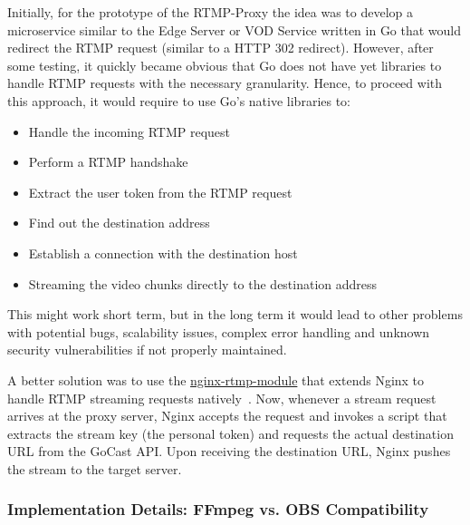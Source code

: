 Initially, for the prototype of the RTMP-Proxy the idea was to develop a microservice similar to the Edge Server or VOD Service written in Go that would redirect the \ac{RTMP} request (similar to a HTTP 302 redirect). However, after some testing, it quickly became obvious that Go does not have yet libraries to handle \ac{RTMP} requests with the necessary granularity. Hence, to proceed with this approach, it would require to use Go's native libraries to: 
\begin{itemize}
\item Handle the incoming \ac{RTMP} request
\item Perform a \ac{RTMP} handshake
\item Extract the user token from the \ac{RTMP} request
\item Find out the destination address
\item Establish a connection with the destination host
\item Streaming the video chunks directly to the destination address
\end{itemize}

\noindent This might work short term, but in the long term it would lead to other problems with potential bugs, scalability issues, complex error handling and unknown security vulnerabilities if not properly maintained.

A better solution was to use the \href{https://github.com/arut/nginx-rtmp-module}{nginx-rtmp-module}\footnotemark[7] that extends Nginx to handle \ac{RTMP} streaming requests natively~\parencite{nginx_rtmp_module}. 
Now, whenever a stream request arrives at the proxy server, Nginx accepts the request and invokes a script that extracts the stream key (the personal token) and requests the actual destination URL from the GoCast \ac{API}. Upon receiving the destination URL, Nginx pushes the stream to the target server.

\subsubsection{Implementation Details: FFmpeg vs. OBS Compatibility}


